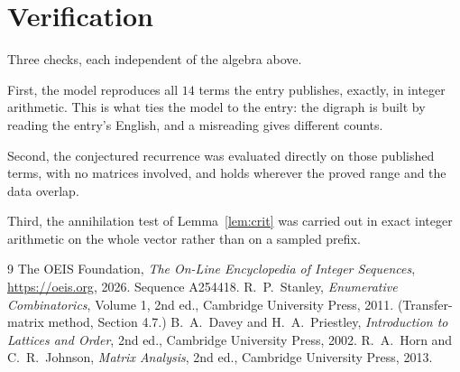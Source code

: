 \documentclass[11pt,a4paper]{article}
\theoremstyle{plain}
\theoremstyle{definition}
\begin{document}
\section{Verification}

Three checks, each independent of the algebra above.

First, the model reproduces all $14$ terms the entry publishes, exactly, in integer
arithmetic. This is what ties the model to the entry: the digraph is built by reading the
entry's English, and a misreading gives different counts.

Second, the conjectured recurrence was evaluated directly on those published terms, with no
matrices involved, and holds wherever the proved range and the data overlap.

Third, the annihilation test of Lemma~\ref{lem:crit} was carried out in exact integer
arithmetic on the whole vector rather than on a sampled prefix.

\begin{thebibliography}{9}
 The OEIS Foundation, \emph{The On-Line Encyclopedia of Integer
Sequences}, \url{https://oeis.org}, 2026. Sequence A254418.
 R.~P.~Stanley, \emph{Enumerative Combinatorics}, Volume 1, 2nd ed.,
Cambridge University Press, 2011. (Transfer-matrix method, Section 4.7.)
 B.~A.~Davey and H.~A.~Priestley, \emph{Introduction to Lattices and
Order}, 2nd ed., Cambridge University Press, 2002.
 R.~A.~Horn and C.~R.~Johnson, \emph{Matrix Analysis}, 2nd ed., Cambridge
University Press, 2013.
\end{thebibliography}
\end{document}
